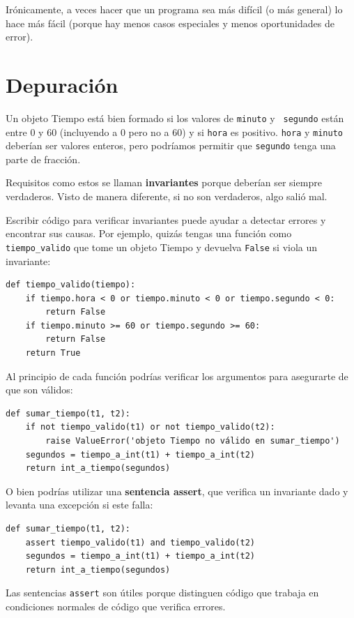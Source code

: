 \documentclass[10pt]{book}
\begin{document}
Irónicamente, a veces hacer que un programa sea más difícil (o más general) lo hace
más fácil (porque hay menos casos especiales y menos oportunidades
de error).


\section{Depuración}

Un objeto Tiempo está bien formado si los valores de {\tt minuto} y {\tt
segundo} están entre 0 y 60 (incluyendo a 0 pero no a 60) y si
{\tt hora} es positivo.  {\tt hora} y {\tt minuto} deberían ser
valores enteros, pero podríamos permitir que {\tt segundo} tenga una
parte de fracción.

Requisitos como estos se llaman {\bf invariantes} porque
deberían ser siempre verdaderos.  Visto de manera diferente, si no
son verdaderos, algo salió mal.

Escribir código para verificar invariantes puede ayudar a detectar errores
y encontrar sus causas.  Por ejemplo, quizás tengas una función
como \verb"tiempo_valido" que tome un objeto Tiempo y devuelva
{\tt False} si viola un invariante:

\begin{verbatim}
def tiempo_valido(tiempo):
    if tiempo.hora < 0 or tiempo.minuto < 0 or tiempo.segundo < 0:
        return False
    if tiempo.minuto >= 60 or tiempo.segundo >= 60:
        return False
    return True
\end{verbatim}
%
Al principio de cada función podrías verificar los
argumentos para asegurarte de que son válidos:

\begin{verbatim}
def sumar_tiempo(t1, t2):
    if not tiempo_valido(t1) or not tiempo_valido(t2):
        raise ValueError('objeto Tiempo no válido en sumar_tiempo')
    segundos = tiempo_a_int(t1) + tiempo_a_int(t2)
    return int_a_tiempo(segundos)
\end{verbatim}
%
O bien podrías utilizar una {\bf sentencia assert}, que verifica un invariante dado
y levanta una excepción si este falla:

\begin{verbatim}
def sumar_tiempo(t1, t2):
    assert tiempo_valido(t1) and tiempo_valido(t2)
    segundos = tiempo_a_int(t1) + tiempo_a_int(t2)
    return int_a_tiempo(segundos)
\end{verbatim}
%
Las sentencias {\tt assert} son útiles porque distinguen
código que trabaja en condiciones normales de código
que verifica errores.
\end{document}
